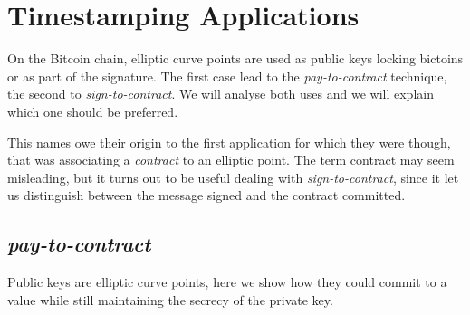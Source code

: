 \section{Timestamping Applications}
On the Bitcoin chain, elliptic curve points are used as public keys locking bictoins or as part of the signature. The first case lead to the \textit{pay-to-contract} technique, the second to \textit{sign-to-contract}. We will analyse both uses and we will explain which one should be preferred.

This names owe their origin to the first application for which they were though, that was associating a \textit{contract} to an elliptic point. 
The term contract may seem misleading, but it turns out to be useful dealing with \textit{sign-to-contract}, since it let us distinguish between the message signed and the contract committed.

\subsection{\textit{pay-to-contract}}
Public keys are elliptic curve points, here we show how they could commit to a value while still maintaining the secrecy of the private key.

